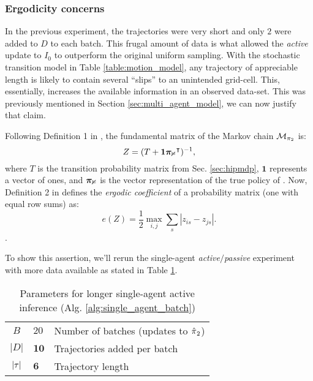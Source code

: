 \subsubsection{Ergodicity concerns}

In the previous experiment, the trajectories were very short and only $2$ were added to $D$ to each batch. This frugal
amount of data is what allowed the \emph{active} update to $I_0$ to outperform the original uniform sampling. With the
stochastic transition model in Table \ref{table:motion_model}, any trajectory of appreciable length is likely to contain
several ``slips'' to an unintended grid-cell. This, essentially, increases the available information in an observed
data-set. This was previously mentioned in Section \ref{sec:multi_agent_model}, we can now justify that claim.

Following Definition 1 in \cite{Hanawal2017LearningPolicies}, the fundamental matrix of the Markov chain
$\mathcal{M}_{\pi_{2}}$ is:
\[
Z = (T + \mathbf{1}\boldsymbol{\mathbb{\pi_{2}}}^{\intercal})^{-1},
\]
where $T$ is the transition probability matrix from Sec. \ref{sec:hipmdp}, $\mathbf{1}$ represents a vector of ones, and
$\boldsymbol{\mathbb{\pi_{2}}}$ is the vector representation of the true policy of . Now, Definition 2 in
\cite{Hanawal2017LearningPolicies} defines the \emph{ergodic coefficient} of a probability matrix (one with equal row
sums) as:
\[
e(Z) = \frac{1}{2}\max_{i,j} \sum_s |z_{is} - z_{js}|.
\]
\cite{Hanawal2017LearningPolicies}.

To show this assertion, we'll rerun the single-agent \emph{active}$/$\emph{passive} experiment with more data available
as stated in Table \ref{table:single_agent_active_alg_params_long}.

    \begin{table}[htb]
        \centering
        \begin{tabular}{c|l l}
                $B$ & $20$ & Number of batches (updates to $\hat{\pi_{}}_2$)\\
                $|D|$ & $\mathbf{10}$ & Trajectories added per batch \\
                $|\tau|$ & $\mathbf{6}$ & Trajectory length \\
        \end{tabular}
        \caption{Parameters for longer single-agent active inference (Alg. \ref{alg:single_agent_batch})}
        \label{table:single_agent_active_alg_params_long}
\end{table}

